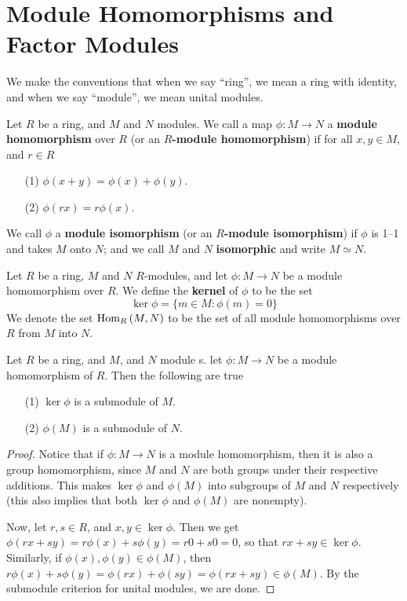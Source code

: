 \section{Module Homomorphisms and Factor Modules}

We make the conventions that when we say ``ring'', we mean a ring with identity,
and when we say ``module'', we mean unital modules.

\begin{definition}
    Let $R$ be a ring, and $M$ and  $N$ modules. We call a map $\phi:M
    \xrightarrow{} N$ a  \textbf{module homomorphism} over $R$ (or an
    \textbf{$R$-module homomorphism}) if for all $x,y \in M$, and  $r \in R$
    \begin{enumerate}
        \item[(1)] $\phi(x+y)=\phi(x)+\phi(y)$.

        \item[(2)] $\phi(rx)=r\phi(x)$.
    \end{enumerate}
    We call $\phi$ a \textbf{module isomorphism} (or an \textbf{$R$-module
    isomorphism}) if $\phi$ is 1--1 and takes $M$ onto $N$; and we call  $M$ and
     $N$  \textbf{isomorphic} and write $M \simeq N$.
\end{definition}

\begin{definition}
    Let $R$ be a ring,  $M$ and  $N$  $R$-modules, and let $\phi:M
    \xrightarrow{} N$ be a module homomorphism over $R$. We define the
    \textbf{kernel} of $\phi$ to be the set
    \begin{equation*}
        \ker{\phi}=\{m \in M : \phi(m)=0\}
    \end{equation*}
    We denote the set $\operatorname{Hom}_R{(M,N)}$ to be the set of all module homomorphisms
    over $R$ from $M$ into $N$.
\end{definition}

\begin{lemma}\label{4.2.1}
    Let $R$ be a ring, and  $M$, and $N$ module s. let $\phi:M \xrightarrow{} N$
    be a module homomorphism of $R$. Then the following are true
    \begin{enumerate}
        \item[(1)] $\ker{\phi}$ is a submodule of $M$.

        \item[(2)] $\phi(M)$ is a submodule of $N$.
    \end{enumerate}
\end{lemma}
\begin{proof}
    Notice that if $\phi:M \xrightarrow{} N$ is a module homomorphism, then it
    is also a group homomorphism, since $M$ and $N$ are both groups under their
    respective additions. This makes $\ker{\phi}$ and $\phi(M)$ into subgroups
    of $M$ and  $N$ respectively (this also implies that both $\ker{\phi}$ and
    $\phi(M)$ are nonempty).

    Now, let $r,s \in R$, and  $x,y \in \ker{\phi}$. Then we get
    $\phi(rx+sy)=r\phi(x)+s\phi(y)=r0+s0=0$, so that $rx+sy \in \ker{\phi}$.
    Similarly, if $\phi(x), \phi(y) \in \phi(M)$, then
    $r\phi(x)+s\phi(y)=\phi(rx)+\phi(sy)=\phi(rx+sy) \in \phi(M)$. By the
    submodule criterion for unital modules, we are done.
\end{proof}
